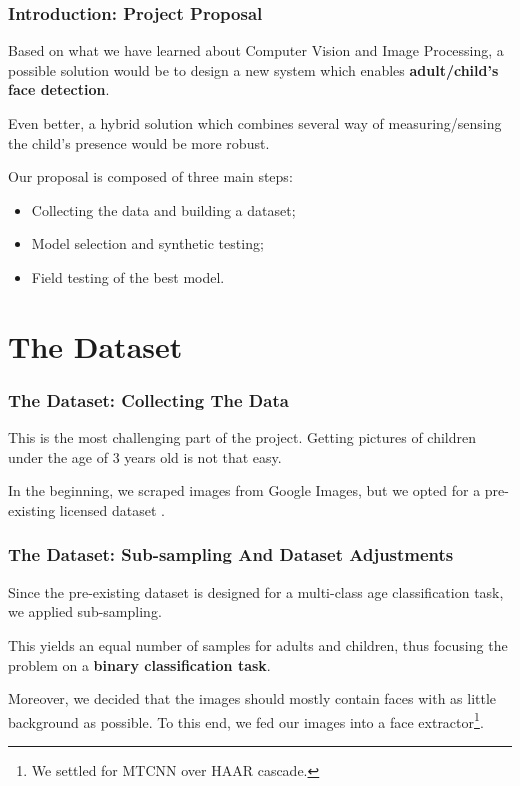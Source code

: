 \documentclass{beamer}
\begin{document}
	\begin{frame}
		\frametitle{Introduction: Project Proposal}
		Based on what we have learned about Computer Vision and Image Processing, a possible solution would be to design a new system which enables \textbf{adult/child's face detection}.
		
		Even better, a hybrid solution which combines several way of measuring/sensing the child's presence would be more robust.
		
		\bigskip
		
		Our proposal is composed of three main steps:
		\begin{itemize}
			\item Collecting the data and building a dataset;
			\item Model selection and synthetic testing;
			\item Field testing of the best model.
		\end{itemize}
	\end{frame}
	
	\section{The Dataset}
	
	\begin{frame}
		\frametitle{The Dataset: Collecting The Data}
		This is the most challenging part of the project. Getting pictures of children under the age of 3 years old is not that easy.
		
		\bigskip
	
		In the beginning, we scraped images from Google Images, but we opted for a pre-existing licensed dataset \footfullcite{eidinger2014age}.
	\end{frame}

	\begin{frame}
		\frametitle{The Dataset: Sub-sampling And Dataset Adjustments}
		Since the pre-existing dataset is designed for a multi-class age classification task, we applied sub-sampling.
		
		\bigskip
		
		This yields an equal number of samples for adults and children, thus focusing the problem on a \textbf{binary classification task}.
		
		\bigskip
		
		Moreover, we decided that the images should mostly contain faces with as little background as possible. To this end, we fed our images into a face extractor\footnote{We settled for MTCNN over HAAR cascade.}.

	\end{frame}
\end{document}
